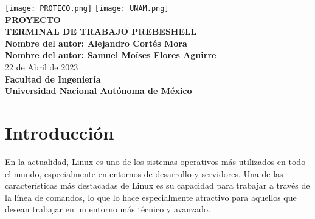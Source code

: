\documentclass{article}
\begin{document}
\begin{titlepage}
    \begin{center}
        \texttt{[image: PROTECO.png]}\hfill
        \hspace{5cm}
        \texttt{[image: UNAM.png]}\\[1cm]
        \vspace{1cm}
        \fontsize{30}{10}\selectfont
        \textbf{PROYECTO}\\
        \vspace{0.5cm}
        \fontsize{25}{10}\selectfont
        \textbf{TERMINAL DE TRABAJO 
        PREBESHELL}\\
        \vspace{1.5cm}
        \fontsize{20}{10}\selectfont
        \textbf{Nombre del autor: Alejandro Cortés Mora}\\
        \vspace{0.5cm}
        \textbf{Nombre del autor: Samuel Moíses Flores Aguirre}\\
        \vspace{0.5cm}
        \large 22 de Abril de 2023\\
        \vspace{1.5cm}
        \vspace{1cm}
        \textbf{Facultad de Ingeniería}\\
        \textbf{Universidad Nacional Autónoma de México}\\
        \vspace{1cm}
    \end{center}
\end{titlepage}


\section{Introducción}
\vspace{0.7cm}

\fontsize{14}{8}\selectfont
\textbf{}
En la actualidad, Linux es uno de los sistemas operativos más utilizados en todo el mundo, especialmente en entornos de desarrollo y servidores. Una de las características más destacadas de Linux es su capacidad para trabajar a través de la línea de comandos, lo que lo hace especialmente atractivo para aquellos que desean trabajar en un entorno más técnico y avanzado.
\end{document}
